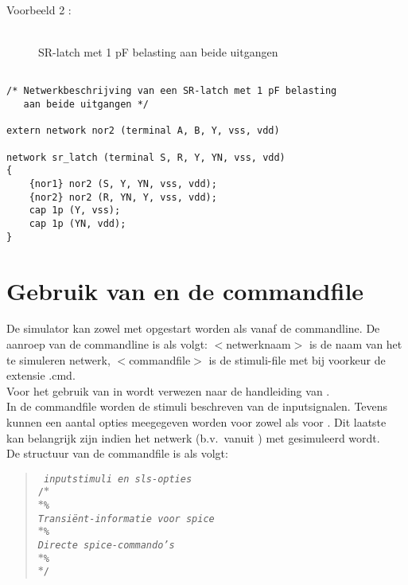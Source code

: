 \clearpage

Voorbeeld 2 :\\
\\

\begin{figure}[thb]
\centerline{}
\caption{\label{latch} SR-latch met 1 pF belasting aan beide uitgangen}
\end{figure}


\begin{verbatim}

/* Netwerkbeschrijving van een SR-latch met 1 pF belasting 
   aan beide uitgangen */

extern network nor2 (terminal A, B, Y, vss, vdd)

network sr_latch (terminal S, R, Y, YN, vss, vdd)
{
    {nor1} nor2 (S, Y, YN, vss, vdd);
    {nor2} nor2 (R, YN, Y, vss, vdd);
    cap 1p (Y, vss);
    cap 1p (YN, vdd);
}
\end{verbatim}
\clearpage

\section{Gebruik van  en de commandfile}

De simulator  kan zowel met  opgestart worden als vanaf
de commandline. De aanroep van de commandline is als volgt:
$<$netwerknaam$>$ is de naam van het te simuleren netwerk, $<$commandfile$>$ is de stimuli-file
met bij voorkeur de extensie .cmd.\\
Voor het gebruik van  in  wordt verwezen naar de handleiding van
.\\
In de commandfile worden de stimuli beschreven van de inputsignalen. Tevens kunnen
een aantal opties meegegeven worden voor zowel  als voor . Dit laatste 
kan belangrijk zijn indien het netwerk (b.v.\ vanuit )
met  gesimuleerd wordt.\\
De structuur van de commandfile is als volgt: 
\begin{quote}
{\tt
{\it inputstimuli en sls-opties}\\
/$\ast$\\
$\ast$\%\\
{\it Transi\"ent-informatie voor spice}\\
$\ast$\%\\
{\it Directe spice-commando's}\\
$\ast$\%\\
$\ast$/\\
}
\end{quote}

